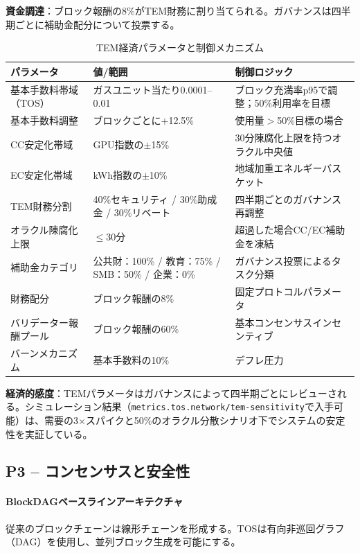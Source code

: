 \documentclass[11pt]{article}
\begin{document}
\textbf{資金調達}：ブロック報酬の8\%がTEM財務に割り当てられる。ガバナンスは四半期ごとに補助金配分について投票する。

\begin{table}[H]
\centering
\caption{TEM経済パラメータと制御メカニズム}
\label{tab:tem-parameters}
\begin{tabular}{@{}p{}p{}p{}@{}}
\toprule
\textbf{パラメータ} & \textbf{値/範囲} & \textbf{制御ロジック} \\ \midrule
基本手数料帯域（TOS） & ガスユニット当たり0.0001--0.01 & ブロック充満率p95で調整；50\%利用率を目標 \\
基本手数料調整 & ブロックごとに+12.5\% & 使用量$>$50\%目標の場合 \\
CC安定化帯域 & GPU指数の$\pm$15\% & 30分陳腐化上限を持つオラクル中央値 \\
EC安定化帯域 & kWh指数の$\pm$10\% & 地域加重エネルギーバスケット \\
TEM財務分割 & 40\%セキュリティ / 30\%助成金 / 30\%リベート & 四半期ごとのガバナンス再調整 \\
オラクル陳腐化上限 & $\le$30分 & 超過した場合CC/EC補助金を凍結 \\
補助金カテゴリ & 公共財：100\% / 教育：75\% / SMB：50\% / 企業：0\% & ガバナンス投票によるタスク分類 \\
財務配分 & ブロック報酬の8\% & 固定プロトコルパラメータ \\
バリデーター報酬プール & ブロック報酬の60\% & 基本コンセンサスインセンティブ \\
バーンメカニズム & 基本手数料の10\% & デフレ圧力 \\
\bottomrule
\end{tabular}
\end{table}

\textbf{経済的感度}：TEMパラメータはガバナンスによって四半期ごとにレビューされる。シミュレーション結果（\texttt{metrics.tos.network/tem-sensitivity}で入手可能）は、需要の3$\times$スパイクと50\%のオラクル分散シナリオ下でシステムの安定性を実証している。

\subsection{P3 -- コンセンサスと安全性}
\label{sec:pillar-consensus}

\paragraph{BlockDAGベースラインアーキテクチャ}
従来のブロックチェーンは線形チェーンを形成する。TOSは有向非巡回グラフ（DAG）を使用し、並列ブロック生成を可能にする。
\end{document}
